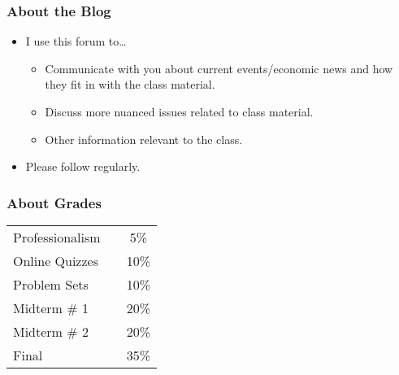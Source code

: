 \documentclass[10pt]{beamer}
\begin{document}

\begin{frame}[t]
\frametitle{About the Blog}
\begin{itemize}
\item I use this forum to\ldots
\begin{itemize}
\medskip
\item Communicate with you about current events/economic news and how they fit in with the class material.
\medskip
\item Discuss more nuanced issues related to class material.
\medskip
\item Other information relevant to the class.
\end{itemize}
\bigskip
\item Please follow regularly.
\end{itemize}
\end{frame}



\begin{frame}[t]
\frametitle{About Grades}
\bigskip
\begin{table}[t]
\setlength {\tabcolsep}{3.75mm}
\vspace{0.01cm}
\renewcommand{\arraystretch}{1.5}
\begin{center}
\begin{tabular}{lcc}
\hline
    Professionalism &\hspace*{0.50in}&   5\%  \\
    Online Quizzes && 10\% \\
    Problem Sets &&  10\% \\
    Midterm \# 1 &&  20\% \\
    Midterm \# 2 &&  20\% \\
    Final &&  35\% \\
    \hline
\end{tabular}
\end{center}
\end{table}

\end{frame}


\end{document}
